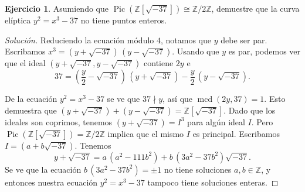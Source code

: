 \documentclass{article}
\newcounter{tarea}
\theoremstyle{definition}
\newtheorem{ejercicio}{Ejercicio}[tarea]
\newenvironment{solucion}{\begin{proof}[Solución]}{\end{proof}}
\newcommand{\ZZ}{\mathbb{Z}}
\DeclareMathOperator{\Pic}{Pic}
\renewcommand{\gcd}{\operatorname{mcd}}
\begin{document}
\begin{ejercicio}
  Asumiendo que $\operatorname{Pic} (\mathbb{Z} [\sqrt{-37}]) \cong \mathbb{Z}/2\mathbb{Z}$,
  demuestre que la curva elíptica $y^2 = x^3 - 37$ no tiene puntos enteros.

  \ifdefined\solutions
  \begin{solucion}
    Reduciendo la ecuación módulo $4$, notamos que $y$ debe ser par. Escribamos
    $x^3 = (y + \sqrt{-37})\,(y - \sqrt{-37})$.  Usando que $y$ es par, podemos
    ver que el ideal $(y + \sqrt{-37}, y - \sqrt{-37})$ contiene $2y$ e
    \[ 37 = \left(\frac{y}{2} - \sqrt{-37}\right)\,(y + \sqrt{-37})
            - \frac{y}{2}\,(y - \sqrt{-37}). \]

    De la ecuación $y^2 = x^3 - 37$ se ve que $37 \nmid y$, así que
    $\gcd(2y, 37) = 1$. Esto demuestra que
    $(y + \sqrt{-37}) + (y - \sqrt{-37}) = \ZZ[\sqrt{-37}]$. Dado que los
    ideales son coprimos, tenemos $(y + \sqrt{-37}) = I^3$ para algún ideal
    $I$. Pero $\Pic(\ZZ[\sqrt{-37}]) = \ZZ/2\ZZ$ implica que el mismo $I$ es
    principal. Escribamos $I = (a + b\sqrt{-37})$. Tenemos
    $$y + \sqrt{-37} = a\,(a^2 - 111b^2 ) + b\,(3a^2 - 37b^2)\sqrt{-37}.$$
    Se ve que la ecuación $b\,(3a^2 - 37b^2) = \pm 1$ no tiene soluciones
    $a, b \in \ZZ$, y entonces nuestra ecuación $y^2 = x^3 - 37$ tampoco tiene
    soluciones enteras.
  \end{solucion}
  \fi
\end{ejercicio}
\end{document}
